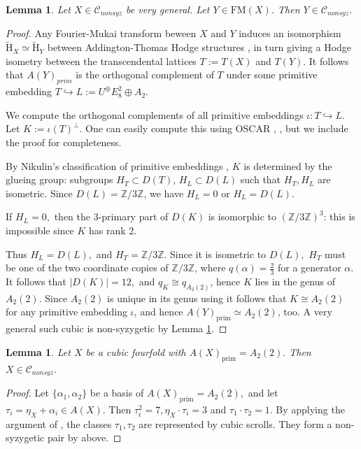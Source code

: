 \documentclass[11pt]{amsart}
\theoremstyle{plain}
\newtheorem{lemma}[theorem]{Lemma}
\numberwithin{equation}{section}
\theoremstyle{definition}
\theoremstyle{remark}
\newcommand{\bZ}{\mathbb{Z}}
\newcommand{\calC}{\mathcal{C}}
\newcommand{\tH}{\widetilde{\mathrm{H}}}
\begin{document}
\begin{lemma}
    Let $X\in \calC_{nonsyz}$ be very general. Let $Y\in \mathrm{FM}(X)$. Then $Y\in \calC_{nonsyz}.$
\end{lemma}
\begin{proof}
    Any Fourier-Mukai transform beween $X$ and $Y$ induces an isomorphism $\tH_X\simeq \tH_Y$ between Addington-Thomas Hodge structures \cite[Proposition 3.4]{Huy17}, in turn giving a Hodge isometry between the transcendental lattices $T:=T(X)$ and $T(Y)$.  It follows that $A(Y)_{prim}$ is the orthogonal complement of $T$ under some primitive embedding $T\hookrightarrow L:=U^\oplus E_8^2\oplus A_2.$

    We compute the orthogonal complements of all primitive embeddings $\iota:T\hookrightarrow L$. Let $K:=\iota(T)^\perp$. One can easily compute this using OSCAR \cite{OSCAR}, \cite{OSCAR-book}, but we include the proof for completeness.
    
    By Nikulin's classification of primitive embeddings \cite[Proposition 1.15.1]{nikulin}, $K$ is determined by the glueing group: subgroups $H_T\subset D(T)$, $H_L\subset D(L)$ such that $H_T, H_L$ are isometric. Since $D(L)=\bZ/3\bZ$, we have $H_L=0$ or $H_L=D(L).$

    If $H_L=0,$ then the 3-primary part of $D(K)$ is isomorphic to $(\bZ/3\bZ)^3$: this is impossible since $K$ has rank 2.

    Thus $H_L=D(L),$ and $H_T=\bZ/3\bZ$. Since it is isometric to $D(L),$ $H_T$ must be one of the two coordinate copies of $\bZ/3\bZ$, where $q(\alpha)= \frac{2}{3}$ for a generator $\alpha.$ It follows that $|D(K)|=12,$ and $q_K\cong q_{A_2(2)}$, hence $K$ lies in the genus of $A_2(2).$ Since $A_2(2)$ is unique in its genus using \cite[Lemma A.7]{Mar23} it follows that $K\cong A_2(2)$ for any primitive embedding $\iota$, and hence $A(Y)_{\mathrm{prim}} \simeq A_2(2)$, too. A very general such cubic is non-syzygetic by Lemma \ref{lScrollRep}. 
\end{proof}
\begin{lemma}\label{lScrollRep}
    Let $X$ be a cubic fourfold with $A(X)_{\mathrm{prim}}=A_2(2).$ Then $X\in \calC_{nonsyz}.$
\end{lemma}
\begin{proof}
    Let $\{\alpha_1, \alpha_2\}$ be a basis of $A(X)_{\mathrm{prim}}=A_2(2),$ and let $\tau_i=\eta_X+\alpha_i\in A(X).$ Then $\tau_i^2=7, \eta_X\cdot \tau_i=3$ and $\tau_1\cdot \tau_2=1.$ By applying the argument of \cite[Lemma 2.11]{BFMQ24}, the classes $\tau_1, \tau_2$ are represented by cubic scrolls. They form a non-syzygetic pair by above.
\end{proof}
\end{document}
